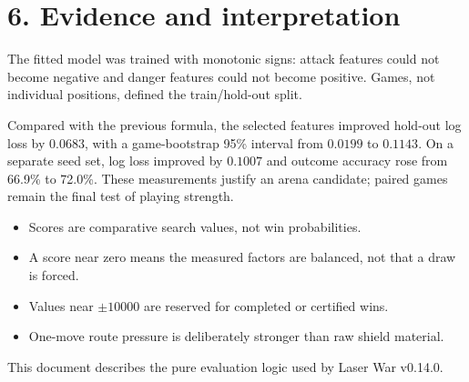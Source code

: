 \documentclass[11pt]{article}
\newcommand{\GameVersion}{v0.14.0}
\newcommand{\MateScore}{10000}
\begin{document}
\section*{6. Evidence and interpretation}

The fitted model was trained with monotonic signs: attack features could not become
negative and danger features could not become positive. Games, not individual
positions, defined the train/hold-out split.

Compared with the previous formula, the selected features improved hold-out log
loss by \(0.0683\), with a game-bootstrap 95\% interval from \(0.0199\) to
\(0.1143\). On a separate seed set, log loss improved by \(0.1007\) and outcome
accuracy rose from 66.9\% to 72.0\%. These measurements justify an arena candidate;
paired games remain the final test of playing strength.

\begin{itemize}
  \item Scores are comparative search values, not win probabilities.
  \item A score near zero means the measured factors are balanced, not that a draw
  is forced.
  \item Values near \(\pm\MateScore\) are reserved for completed or certified wins.
  \item One-move route pressure is deliberately stronger than raw shield material.
\end{itemize}

\vfill
\begin{center}
\small\color{muted}
This document describes the pure evaluation logic used by Laser War \GameVersion.
\end{center}
\end{document}
